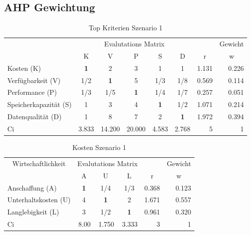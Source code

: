 \subsection{AHP Gewichtung}
\begin{table}[htbp]
\caption{Top Kriterien Szenario 1}
\begin{tabular}{|l|c|c|c|c|c|r|r|}
\hline
\multicolumn{ 1}{|c|}{} & \multicolumn{ 5}{c|}{Evalutations Matrix} & \multicolumn{1}{l|}{} & \multicolumn{1}{l|}{Gewicht} \\ \cline{ 2- 8}
\multicolumn{ 1}{|c|}{} & K & V & P & S & D & \multicolumn{1}{c|}{r} & \multicolumn{1}{c|}{w} \\ \hline
Kosten (K) & \textbf{1} & 2 & 3 & 1 & 1 & 1.131 & 0.226 \\ \hline
Verfügbarkeit (V) &  1/2 & \textbf{1} & 5 &  1/3 &  1/8 & 0.569 & 0.114 \\ \hline
Performance (P) &  1/3 &  1/5 & \textbf{1} &  1/4 &  1/7 & 0.257 & 0.051 \\ \hline
Speicherkapazität (S) & 1 & 3 & 4 & \textbf{1} &  1/2 & 1.071 & 0.214 \\ \hline
Datenqualität (D) & 1 & 8 & 7 & 2 & \textbf{1} & 1.972 & 0.394 \\ \hline  \hline
Ci & \multicolumn{1}{r|}{3.833} & \multicolumn{1}{r|}{14.200} & \multicolumn{1}{r|}{20.000} & \multicolumn{1}{r|}{4.583} & \multicolumn{1}{r|}{2.768} & 5 & 1 \\ \hline 
\end{tabular}
\label{AHPTopKriterienS1}
\end{table}


\begin{table}[htbp]
\caption{Kosten Szenario 1}
\begin{tabular}{|l|c|c|c|r|r|}
\hline
\multicolumn{ 1}{|c|}{Wirtschaftlichkeit} & \multicolumn{ 3}{c|}{Evalutations Matrix} & \multicolumn{1}{l|}{} & \multicolumn{1}{l|}{Gewicht} \\ \cline{ 2- 6}
\multicolumn{ 1}{|c|}{} & A & U & L & \multicolumn{1}{c|}{r} & \multicolumn{1}{c|}{w} \\ \hline
Anschaffung (A) & \textbf{1} &  1/4 &  1/3 & 0.368 & 0.123 \\ \hline
Unterhaltskosten (U)  & 4 & \textbf{1} & 2 & 1.671 & 0.557 \\ \hline
Langlebigkeit (L) & 3 &  1/2 & \textbf{1} & 0.961 & 0.320 \\ \hline \hline 
Ci & \multicolumn{1}{r|}{8.00} & \multicolumn{1}{r|}{1.750} & \multicolumn{1}{r|}{3.333} & 3 & 1 \\ \hline
\end{tabular}
\label{AHPKostenS1}
\end{table}

